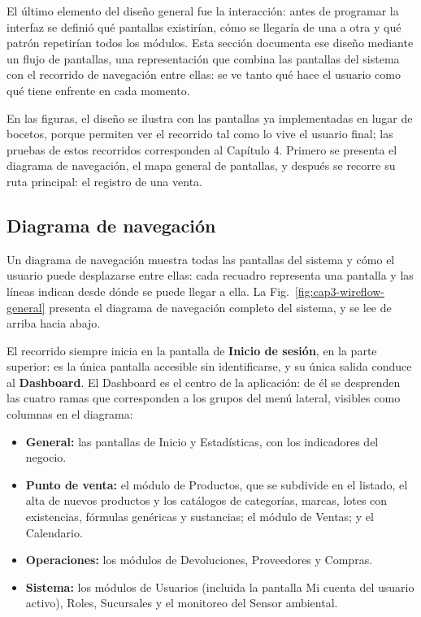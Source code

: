 El último elemento del diseño general fue la interacción: antes de programar la interfaz se definió qué pantallas existirían, cómo se llegaría de una a otra y qué patrón repetirían todos los módulos. Esta sección documenta ese diseño mediante un flujo de pantallas, una representación que combina las pantallas del sistema con el recorrido de navegación entre ellas: se ve tanto qué hace el usuario como qué tiene enfrente en cada momento.

En las figuras, el diseño se ilustra con las pantallas ya implementadas en lugar de bocetos, porque permiten ver el recorrido tal como lo vive el usuario final; las pruebas de estos recorridos corresponden al Capítulo 4. Primero se presenta el diagrama de navegación, el mapa general de pantallas, y después se recorre su ruta principal: el registro de una venta.

\subsection{Diagrama de navegación}

Un diagrama de navegación muestra todas las pantallas del sistema y cómo el usuario puede desplazarse entre ellas: cada recuadro representa una pantalla y las líneas indican desde dónde se puede llegar a ella. La Fig.~\ref{fig:cap3-wireflow-general} presenta el diagrama de navegación completo del sistema, y se lee de arriba hacia abajo.

El recorrido siempre inicia en la pantalla de \textbf{Inicio de sesión}, en la parte superior: es la única pantalla accesible sin identificarse, y su única salida conduce al \textbf{Dashboard}. El Dashboard es el centro de la aplicación: de él se desprenden las cuatro ramas que corresponden a los grupos del menú lateral, visibles como columnas en el diagrama:

\begin{itemize}[nosep, itemsep=3pt]
    \item \textbf{General:} las pantallas de Inicio y Estadísticas, con los indicadores del negocio.
    \item \textbf{Punto de venta:} el módulo de Productos, que se subdivide en el listado, el alta de nuevos productos y los catálogos de categorías, marcas, lotes con existencias, fórmulas genéricas y sustancias; el módulo de Ventas; y el Calendario.
    \item \textbf{Operaciones:} los módulos de Devoluciones, Proveedores y Compras.
    \item \textbf{Sistema:} los módulos de Usuarios (incluida la pantalla Mi cuenta del usuario activo), Roles, Sucursales y el monitoreo del Sensor ambiental.
\end{itemize}

